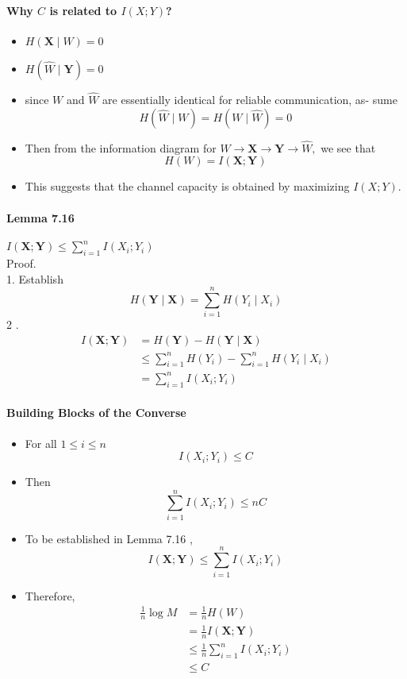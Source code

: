 \documentclass[8pt]{article}
\begin{document}
\paragraph{Why $C$ is related to $I(X;Y)$?}
\begin{itemize}
	\item $H(\mathbf{X} \mid W)=0$
	\item $H(\hat{W} \mid \mathbf{Y})=0$
	\item since $W$ and $\hat{W}$ are essentially identical for reliable communication, as-
	sume
	$$
	H(\hat{W} \mid W)=H(W \mid \hat{W})=0
	$$
	\item Then from the information diagram for $W \rightarrow \mathbf{X} \rightarrow \mathbf{Y} \rightarrow \hat{W},$ we see that
	$$
	H(W)=I(\mathbf{X} ; \mathbf{Y})
	$$
	\item This suggests that the channel capacity is obtained by maximizing $I(X ; Y)$.
\end{itemize}

\paragraph{Lemma 7.16} $I(\mathbf{X} ; \mathbf{Y}) \leq \sum_{i=1}^{n} I\left(X_{i} ; Y_{i}\right)$\\
Proof.\\
1. Establish
$$
H(\mathbf{Y} \mid \mathbf{X})=\sum_{i=1}^{n} H\left(Y_{i} \mid X_{i}\right)
$$
2 .
$$
\begin{aligned}
I(\mathbf{X} ; \mathbf{Y}) &=H(\mathbf{Y})-H(\mathbf{Y} \mid \mathbf{X}) \\
& \leq \sum_{i=1}^{n} H\left(Y_{i}\right)-\sum_{i=1}^{n} H\left(Y_{i} \mid X_{i}\right) \\
&=\sum_{i=1}^{n} I\left(X_{i} ; Y_{i}\right)
\end{aligned}
$$

\paragraph{Building Blocks of the Converse}
\begin{itemize}
	\item For all $1 \leq i \leq n$
$$
I\left(X_{i} ; Y_{i}\right) \leq C
$$
\item Then
$$
\sum_{i=1}^{n} I\left(X_{i} ; Y_{i}\right) \leq n C
$$
\item To be established in Lemma 7.16 ,
$$
I(\mathbf{X} ; \mathbf{Y}) \leq \sum_{i=1}^{n} I\left(X_{i} ; Y_{i}\right)
$$
\item Therefore,
$$
\begin{aligned}
\frac{1}{n} \log M &=\frac{1}{n} H(W) \\
&=\frac{1}{n} I(\mathbf{X} ; \mathbf{Y}) \\
& \leq \frac{1}{n} \sum_{i=1}^{n} I\left(X_{i} ; Y_{i}\right) \\
& \leq C
\end{aligned}
$$
\end{itemize}
\end{document}
